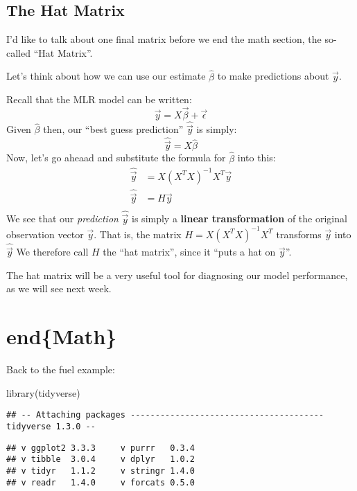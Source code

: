 \documentclass[
]{article}
\newenvironment{Shaded}{\begin{snugshade}}{\end{snugshade}}
\newcommand{\FunctionTok}[1]{\textcolor[rgb]{0.00,0.00,0.00}{#1}}
\newcommand{\NormalTok}[1]{#1}
\begin{document}
\hypertarget{the-hat-matrix}{%
\subsection{The Hat Matrix}\label{the-hat-matrix}}

I'd like to talk about one final matrix before we end the math section,
the so-called ``Hat Matrix''.

Let's think about how we can use our estimate \(\hat{\beta}\) to make
predictions about \(\vec{y}\).

Recall that the MLR model can be written: \[
\vec{y} = X \vec{\beta} + \vec{\epsilon}
\] Given \(\hat{\beta}\) then, our ``best guess prediction''
\(\hat{\vec{y}}\) is simply: \[
\hat{\vec{y}} = X \hat{\beta}
\] Now, let's go aheaad and substitute the formula for \(\hat{\beta}\)
into this: \[
\begin{split}
\hat{\vec{y}} &= X (X^TX)^{-1}X^T \vec{y}\\
\hat{\vec{y}} &= H \vec{y}\\
\end{split}
\] We see that our \emph{prediction} \(\hat{\vec{y}}\) is simply a
\textbf{linear transformation} of the original observation vector
\(\vec{y}\). That is, the matrix \(H=X (X^TX)^{-1}X^T\) transforms
\(\vec{y}\) into \(\hat{\vec{y}}\) We therefore call \(H\) the ``hat
matrix'', since it ``puts a hat on \(\vec{y}\)''.

The hat matrix will be a very useful tool for diagnosing our model
performance, as we will see next week.

\hypertarget{endmath}{%
\section{end\{Math\}}\label{endmath}}

Back to the fuel example:

\begin{Shaded}
\begin{Highlighting}[]
\FunctionTok{library}\NormalTok{(tidyverse)}
\end{Highlighting}
\end{Shaded}

\begin{verbatim}
## -- Attaching packages --------------------------------------- tidyverse 1.3.0 --
\end{verbatim}

\begin{verbatim}
## v ggplot2 3.3.3     v purrr   0.3.4
## v tibble  3.0.4     v dplyr   1.0.2
## v tidyr   1.1.2     v stringr 1.4.0
## v readr   1.4.0     v forcats 0.5.0
\end{verbatim}
\end{document}
